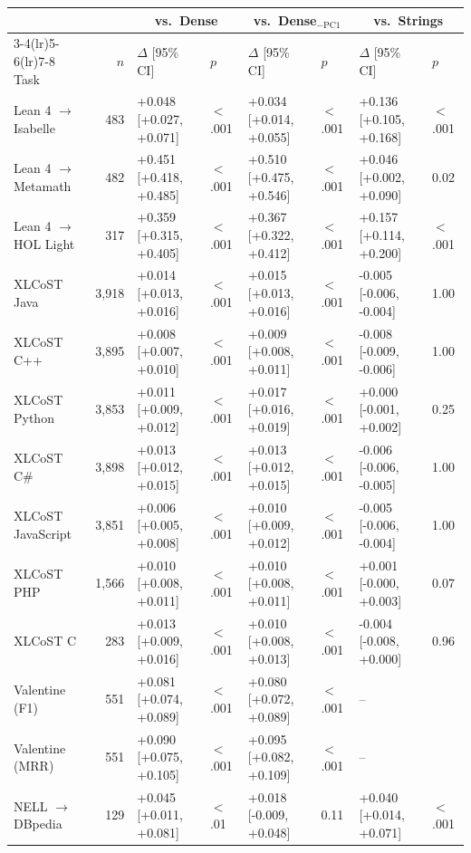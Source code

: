 \begin{tabular}{@{}lrllllll@{}}
\toprule
 & & \multicolumn{2}{c}{vs.\ Dense} & \multicolumn{2}{c}{vs.\ Dense$_{-\mathrm{PC1}}$} & \multicolumn{2}{c}{vs.\ Strings} \\
\cmidrule(lr){3-4}\cmidrule(lr){5-6}\cmidrule(lr){7-8}
Task & $n$ & $\Delta$ [95\% CI] & $p$ & $\Delta$ [95\% CI] & $p$ & $\Delta$ [95\% CI] & $p$ \\
\midrule
Lean 4 $\to$ Isabelle & 483 & +0.048 [+0.027, +0.071] & $<$.001 & +0.034 [+0.014, +0.055] & $<$.001 & +0.136 [+0.105, +0.168] & $<$.001 \\
Lean 4 $\to$ Metamath & 482 & +0.451 [+0.418, +0.485] & $<$.001 & +0.510 [+0.475, +0.546] & $<$.001 & +0.046 [+0.002, +0.090] & 0.02 \\
Lean 4 $\to$ HOL Light & 317 & +0.359 [+0.315, +0.405] & $<$.001 & +0.367 [+0.322, +0.412] & $<$.001 & +0.157 [+0.114, +0.200] & $<$.001 \\
XLCoST Java & 3,918 & +0.014 [+0.013, +0.016] & $<$.001 & +0.015 [+0.013, +0.016] & $<$.001 & -0.005 [-0.006, -0.004] & 1.00 \\
XLCoST C++ & 3,895 & +0.008 [+0.007, +0.010] & $<$.001 & +0.009 [+0.008, +0.011] & $<$.001 & -0.008 [-0.009, -0.006] & 1.00 \\
XLCoST Python & 3,853 & +0.011 [+0.009, +0.012] & $<$.001 & +0.017 [+0.016, +0.019] & $<$.001 & +0.000 [-0.001, +0.002] & 0.25 \\
XLCoST C\# & 3,898 & +0.013 [+0.012, +0.015] & $<$.001 & +0.013 [+0.012, +0.015] & $<$.001 & -0.006 [-0.006, -0.005] & 1.00 \\
XLCoST JavaScript & 3,851 & +0.006 [+0.005, +0.008] & $<$.001 & +0.010 [+0.009, +0.012] & $<$.001 & -0.005 [-0.006, -0.004] & 1.00 \\
XLCoST PHP & 1,566 & +0.010 [+0.008, +0.011] & $<$.001 & +0.010 [+0.008, +0.011] & $<$.001 & +0.001 [-0.000, +0.003] & 0.07 \\
XLCoST C & 283 & +0.013 [+0.009, +0.016] & $<$.001 & +0.010 [+0.008, +0.013] & $<$.001 & -0.004 [-0.008, +0.000] & 0.96 \\
Valentine (F1) & 551 & +0.081 [+0.074, +0.089] & $<$.001 & +0.080 [+0.072, +0.089] & $<$.001 & -- \\
Valentine (MRR) & 551 & +0.090 [+0.075, +0.105] & $<$.001 & +0.095 [+0.082, +0.109] & $<$.001 & -- \\
NELL $\to$ DBpedia & 129 & +0.045 [+0.011, +0.081] & $<$.01 & +0.018 [-0.009, +0.048] & 0.11 & +0.040 [+0.014, +0.071] & $<$.001 \\

\end{tabular}
